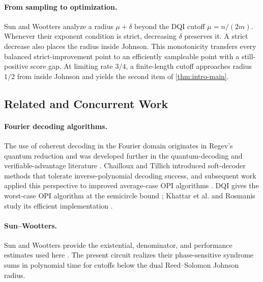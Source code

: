 \documentclass[11pt,letterpaper]{article}
\theoremstyle{definition}
\begin{document}
\paragraph{From sampling to optimization.}
Sun and Wootters analyze a radius $\mu+\delta$ beyond the DQI cutoff $\mu=n/(2m)$.  Whenever their exponent condition is strict, decreasing $\delta$ preserves it.  A strict decrease also places the radius inside Johnson.  This monotonicity transfers every balanced strict-improvement point to an efficiently sampleable point with a still-positive score gap.  At limiting rate $3/4$, a finite-length cutoff approaches radius $1/2$ from inside Johnson and yields the second item of \cref{thm:intro-main}.

\subsection{Related and Concurrent Work}
\label{sec:related-work}

\paragraph{Fourier decoding algorithms.}
The use of coherent decoding in the Fourier domain originates in Regev's quantum reduction and was developed further in the quantum-decoding and verifiable-advantage literature \cite{Regev2009,YamakawaZhandry2024,ChaillouxTillich2024}.  Chailloux and Tillich introduced soft-decoder methods that tolerate inverse-polynomial decoding success, and subsequent work applied this perspective to improved average-case OPI algorithms \cite{ChaillouxTillich2025,Chailloux2025}.  DQI gives the worst-case OPI algorithm at the semicircle bound \cite{JordanEtAl2025}; Khattar et al. and Rosmanis study its efficient implementation \cite{KhattarEtAl2025,Rosmanis2026}.

\paragraph{Sun--Wootters.}
Sun and Wootters provide the existential, denominator, and performance estimates used here \cite{SunWootters2026}.  The present circuit realizes their phase-sensitive syndrome sums in polynomial time for cutoffs below the dual Reed--Solomon Johnson radius.
\end{document}
